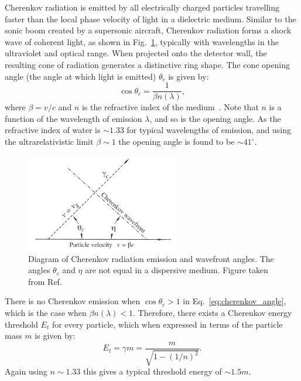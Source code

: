Cherenkov radiation is emitted by all electrically charged particles travelling faster than the
local phase velocity of light in a dielectric medium. Similar to the sonic boom created by a
supersonic aircraft, Cherenkov radiation forms a shock wave of coherent light, as shown in
Fig.~\ref{fig:cherenkov}, typically with wavelengths in the ultraviolet and optical range. When
projected onto the detector wall, the resulting cone of radiation generates a distinctive ring
shape. The cone opening angle (the angle at which light is emitted) $\theta_{c}$ is given by:
\begin{equation}
    \cos\theta_{c} = \frac{1}{\beta n(\lambda)},
    \label{eq:cherenkov_angle}
\end{equation}
where $\beta=v/c$ and $n$ is the refractive index of the medium~\cite{particle2020}. Note that $n$
is a function of the wavelength of emission $\lambda$, and so is the opening angle. As the
refractive index of water is $\sim 1.33$ for typical wavelengths of emission, and using the
ultrarelativistic limit $\beta\sim 1$ the opening angle is found to be $\sim41^{\circ}$.

\begin{figure} %
    \includegraphics[width=0.6\textwidth]{diagrams/4-chips/cherenkov.png}
    \caption[Diagram of Cherenkov radiation emission.]
    {Diagram of Cherenkov radiation emission and wavefront angles. The angles $\theta_{c}$ and
        $\eta$ are not equal in a dispersive medium. Figure taken from Ref.~\cite{particle2020}}
    \label{fig:cherenkov}
\end{figure}

There is no Cherenkov emission when $\cos\theta_{c} > 1$ in Eq.~\ref{eq:cherenkov_angle}, which is
the case when $\beta n(\lambda)<1$. Therefore, there exists a Cherenkov energy threshold $E_{t}$
for every particle, which when expressed in terms of the particle mass $m$ is given by:
\begin{equation}
    E_{t} = \gamma m = \frac{m}{\sqrt{1-(1/n)^{2}}}.
    \label{eq:cherenkov_threshold}
\end{equation}
Again using $n\sim 1.33$ this gives a typical threshold energy of $\sim1.5m$.

